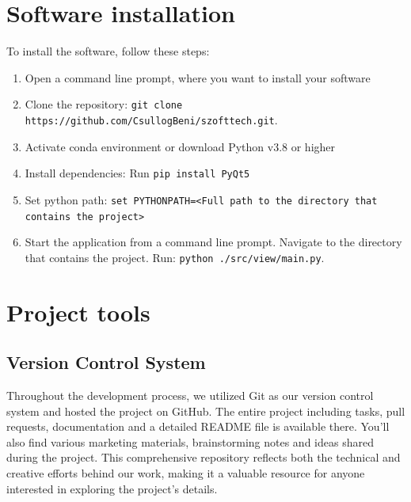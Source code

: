 \documentclass{article}
\begin{document}
\section{Software installation}

To install the software, follow these steps:

\begin{enumerate}
    \item Open a command line prompt, where you want to install your software
    \item Clone the repository\@: \texttt{git clone https://github.com/CsullogBeni/szofttech.git}.
    \item Activate conda environment or download Python v3.8 or higher
    \item Install dependencies\@: Run \texttt{pip install PyQt5}
    \item Set python path: \texttt{set PYTHONPATH=<Full path to the directory that contains the project>}
    \item Start the application from a command line prompt. Navigate to the directory that contains the project. Run: \@\texttt{python ./src/view/main.py}.
\end{enumerate}

\section{Project tools}

\subsection{Version Control System}

Throughout the development process, we utilized Git as our version control system and hosted the project on GitHub. The entire project including tasks, pull requests, documentation and a detailed README file is available there. You'll also find various marketing materials, brainstorming notes and ideas shared during the project. This comprehensive repository reflects both the technical and creative efforts behind our work, making it a valuable resource for anyone interested in exploring the project's details.
\end{document}

